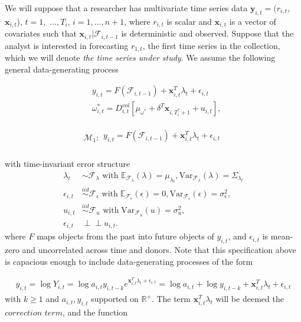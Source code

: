\documentclass[11pt]{article}
\newcommand{\y}{\textbf{y}}
\newcommand{\x}{\textbf{x}}
\newcommand{\simiid}{\stackrel{iid}{\sim}} %
\newcommand{\indep}{\perp \!\!\! \perp } %
\def\mrm#1{\mathrm{#1}} %
\def\mc#1{\mathcal{#1}} %
\def\E{\mathbb{E}} %
\def\mc#1{\mathcal{#1}}
\theoremstyle{definition}
\begin{document}
We will suppose that a researcher has multivariate time series data $\y_{i,t} = (r_{i,t}$, $\x_{i,t}$), $t = 1,$ $\ldots,  T_i$, $i = 1, \ldots, n+1$, where $r_{i,t}$ is scalar and $\x_{i,t}$ is a vector of covariates such that $\x_{i,t}|\mathcal{F}_{i,t-1}$ is deterministic and observed.  Suppose that the analyst is interested in forecasting $r_{1,t}$, the first time series in the collection, which we will denote \textit{the time series under study}.   We assume the following general data-generating process

\begin{align}
  &y_{i,t} = F(\mathcal{F}_{i,t-1}) + \x^{T}_{i,t}\lambda_{t} + \epsilon_{i,t}\label{core_specification}\\
  &\omega_{i,t}^{*} = D^{vol}_{i,t}[\mu_{\omega^{*}}+\delta^{T}\x_{i,T^{*}_{i}+1}+ u_{i,t}],
\end{align} 
 
\begin{align*}
  \mc{M}_1 \colon \begin{array}{l}
    y_{i,t} = F(\mathcal{F}_{i,t-1}) + \x^{T}_{i,t}\lambda_{t} + \epsilon_{i,t}\\[.2cm]
  \end{array}
  \end{align*}

with time-invariant error structure
  \begin{align*}
    \lambda_{t} &\sim \mc{F}_{\lambda}\text{ with }  \E_{\mathcal{F}_{\lambda}}(\lambda) = \mu_{\lambda_{t}}, \mrm{Var}_{\mc{F}_{\lambda}}(\lambda) = \Sigma_{\lambda_{t}}\\
    \epsilon_{i,t} &\simiid \mc{F}_{\epsilon} \text{ with}  \; \E_{\mc{F}_{\epsilon}}(\epsilon) = 0, \mrm{Var}_{\mc{F}_{\epsilon}}(\epsilon)  = \sigma^{2}_{\epsilon},  \\
    u_{i,t} & \simiid  \mc{F}_{u} \text{ with}  \; \mrm{Var}_{\mc{F}_{u}}(u) = \sigma^2_{u},\\
    \epsilon_{i,t} & \indep u_{i,t}.
    \end{align*}
where $F$ maps objects from the past into future objects of $y_{i,t}$, and $\epsilon_{i,t}$ is mean-zero and uncorrelated across time and donors.  Note that this specification above is capacious enough to include data-generating processes of the form 

\begin{align*} 
  y_{i,t} = \log{Y_{i,t}} = \log{a_{i,t}y_{i,t-k}e^{\x^{T}_{i,t}\lambda_{t}+\epsilon_{i,t}}} = \log{a_{i,t}} + \log{y_{i, t-k}} + \x^{T}_{i,t}\lambda_{t} + \epsilon_{i,t}
\end{align*}
with $k\geq1$ and $a_{i,t}, y_{i,t}$ supported on $\mathbb{R}^{+}$.  The term $\x^{T}_{i,t}\lambda_{t}$ will be deemed the $\textit{correction term}$, and the function
\end{document}
